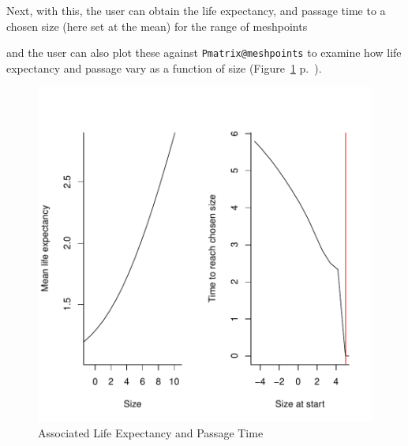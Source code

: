 \documentclass{article}
\begin{document}
Next, with this, the user can obtain the life expectancy, and passage time to a chosen size (here set at the mean) for the range of meshpoints
\begin{Schunk}
\end{Schunk}
and the user can also plot these against {\tt Pmatrix@meshpoints} to examine how
life expectancy and passage vary as a function of size (Figure~\ref{fig:three} p.~\pageref{fig:three}).
\begin{figure}
\begin{center}
\includegraphics{IPMpack_Vignette-fig3}
\end{center}
\caption{Associated Life Expectancy and Passage Time}
\label{fig:three}
\end{figure}
\end{document}
